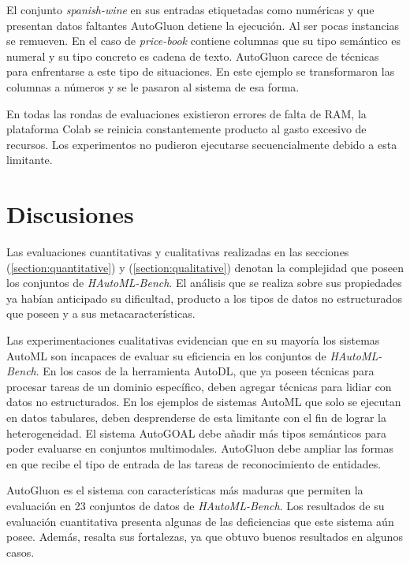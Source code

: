 El conjunto \textit{spanish-wine} en sus entradas etiquetadas como numéricas y que presentan datos faltantes AutoGluon detiene la ejecución. Al ser pocas instancias 
se remueven.
En el caso de \textit{price-book} contiene columnas que su tipo semántico es numeral y su tipo concreto es cadena de texto. AutoGluon carece de técnicas para 
enfrentarse a este tipo de situaciones. En este ejemplo se transformaron las columnas a números y se le pasaron al sistema de esa forma.

En todas las rondas de evaluaciones existieron errores de falta de RAM, la plataforma Colab se reinicia constantemente producto al gasto excesivo de recursos. Los 
experimentos no pudieron ejecutarse secuencialmente debido a esta limitante.

\section{Discusiones}\label{subsection:discussions}

Las evaluaciones cuantitativas y cualitativas realizadas en las secciones (\ref{section:quantitative}) y (\ref{section:qualitative}) denotan la complejidad que poseen 
los conjuntos de \textit{HAutoML-Bench}.
El análisis que se realiza sobre sus propiedades ya habían anticipado su dificultad, producto a los tipos de datos no estructurados que poseen y a sus metacaracterísticas.

Las experimentaciones cualitativas evidencian que en su mayoría los sistemas AutoML son incapaces de evaluar su eficiencia en los conjuntos de \textit{HAutoML-Bench}. 
En los casos de la herramienta AutoDL, que ya poseen técnicas para procesar tareas de un dominio específico, deben agregar técnicas para lidiar con datos no estructurados. 
En los ejemplos de sistemas AutoML que solo se ejecutan en datos tabulares, deben desprenderse de esta limitante con el fin de lograr la heterogeneidad. 
El sistema AutoGOAL debe añadir más tipos semánticos para poder evaluarse en conjuntos multimodales. AutoGluon debe ampliar las formas en que recibe el tipo de entrada 
de las tareas de reconocimiento de entidades.

AutoGluon es el sistema con características más maduras que permiten la evaluación en 23 conjuntos de datos de \textit{HAutoML-Bench}.
Los resultados de su evaluación cuantitativa presenta algunas de las deficiencias que este sistema aún posee. Además, resalta sus fortalezas, ya que obtuvo buenos resultados 
en algunos casos.

